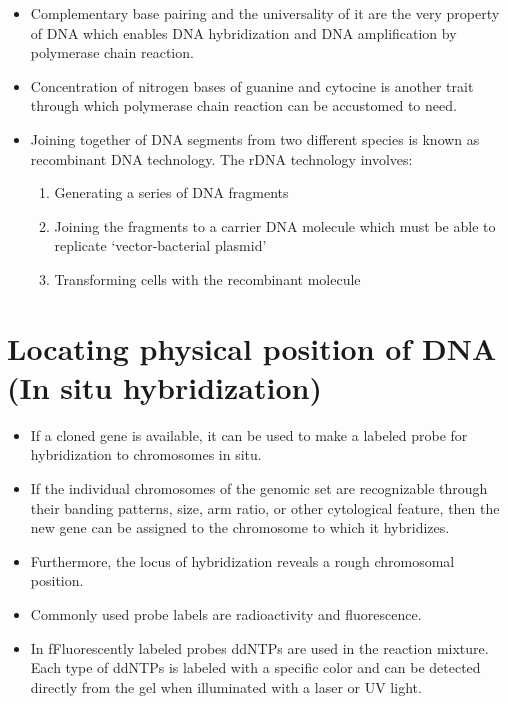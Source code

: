 \documentclass[11pt,dvipsnames,ignorenonframetext,aspectratio=169]{beamer}
\providecommand{\tightlist}{%
  \setlength{\itemsep}{0pt}\setlength{\parskip}{0pt}}
\begin{document}
\begin{frame}{}
\protect\hypertarget{section-1}{}

\begin{itemize}
\tightlist
\item
  Complementary base pairing and the universality of it are the very
  property of DNA which enables DNA hybridization and DNA amplification
  by polymerase chain reaction.
\item
  Concentration of nitrogen bases of guanine and cytocine is another
  trait through which polymerase chain reaction can be accustomed to
  need.
\item
  Joining together of DNA segments from two different species is known
  as recombinant DNA technology. The rDNA technology involves:

  \begin{enumerate}
  \tightlist
  \item
    Generating a series of DNA fragments
  \item
    Joining the fragments to a carrier DNA molecule which must be able
    to replicate `vector-bacterial plasmid'
  \item
    Transforming cells with the recombinant molecule
  \end{enumerate}
\end{itemize}

\end{frame}

\hypertarget{locating-physical-position-of-dna-in-situ-hybridization}{%
\section{Locating physical position of DNA (In situ
hybridization)}\label{locating-physical-position-of-dna-in-situ-hybridization}}

\begin{frame}{}
\protect\hypertarget{section-2}{}

\begin{itemize}
\tightlist
\item
  If a cloned gene is available, it can be used to make a labeled probe
  for hybridization to chromosomes in situ.
\item
  If the individual chromosomes of the genomic set are recognizable
  through their banding patterns, size, arm ratio, or other cytological
  feature, then the new gene can be assigned to the chromosome to which
  it hybridizes.
\item
  Furthermore, the locus of hybridization reveals a rough chromosomal
  position.
\item
  Commonly used probe labels are radioactivity and fluorescence.
\item
  In fFluorescently labeled probes ddNTPs are used in the reaction
  mixture. Each type of ddNTPs is labeled with a specific color and can
  be detected directly from the gel when illuminated with a laser or UV
  light.
\end{itemize}

\end{frame}
\end{document}
